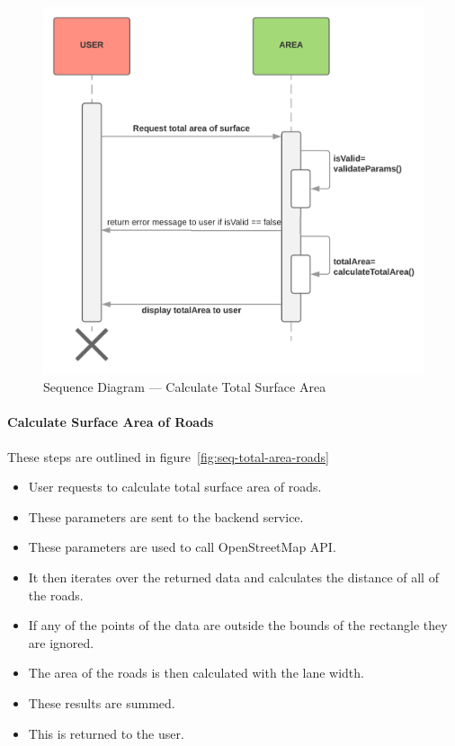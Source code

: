 \documentclass[a4paper,11pt]{article}
\begin{document}
\begin{figure}[H]
  \includegraphics[width=\textwidth]{sequence-diagram-calculate-total-surface-area}
  \caption{Sequence Diagram --- Calculate Total Surface
  Area}\label{fig:seq-total-area}
\end{figure}

\paragraph{Calculate Surface Area of Roads}

These steps are outlined in figure~\ref{fig:seq-total-area-roads}

\begin{itemize}
  \item User requests to calculate total surface area of roads.
  \item These parameters are sent to the backend service.
  \item These parameters are used to call OpenStreetMap API.\@
  \item It then iterates over the returned data and calculates the distance of
    all of the roads.
  \item If any of the points of the data are outside the bounds of the rectangle
    they are ignored.
  \item The area of the roads is then calculated with the lane width.
  \item These results are summed.
  \item This is returned to the user.
\end{itemize}
\end{document}
